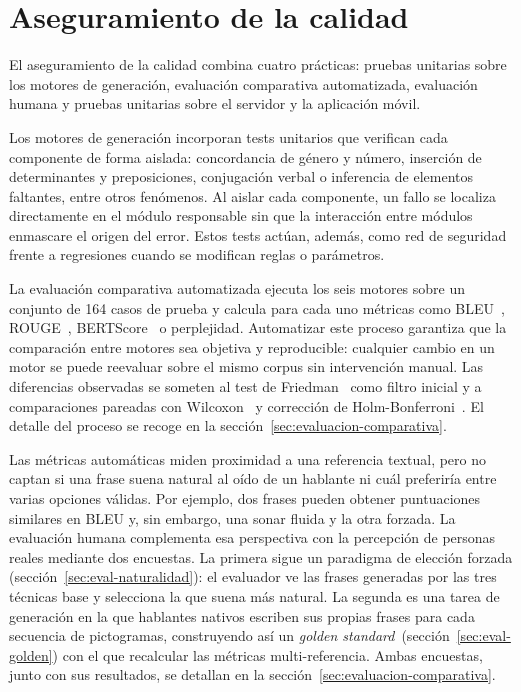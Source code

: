\section{Aseguramiento de la calidad}
\label{sec:calidad}

El aseguramiento de la calidad combina cuatro prácticas: pruebas unitarias sobre los motores de generación, evaluación comparativa automatizada, evaluación humana y pruebas unitarias sobre el servidor y la aplicación móvil.

Los motores de generación incorporan tests unitarios que verifican cada componente de forma aislada: concordancia de género y número, inserción de determinantes y preposiciones, conjugación verbal o inferencia de elementos faltantes, entre otros fenómenos. Al aislar cada componente, un fallo se localiza directamente en el módulo responsable sin que la interacción entre módulos enmascare el origen del error. Estos tests actúan, además, como red de seguridad frente a regresiones cuando se modifican reglas o parámetros.

La evaluación comparativa automatizada ejecuta los seis motores sobre un conjunto de 164 casos de prueba y calcula para cada uno métricas como BLEU~\cite{papineni2002bleu}, ROUGE~\cite{lin2004rouge}, BERTScore~\cite{zhang2020bertscore} o perplejidad. Automatizar este proceso garantiza que la comparación entre motores sea objetiva y reproducible: cualquier cambio en un motor se puede reevaluar sobre el mismo corpus sin intervención manual. Las diferencias observadas se someten al test de Friedman~\cite{friedman1937use} como filtro inicial y a comparaciones pareadas con Wilcoxon~\cite{wilcoxon1945individual} y corrección de Holm-Bonferroni~\cite{holm1979simple}. El detalle del proceso se recoge en la sección~\ref{sec:evaluacion-comparativa}.

Las métricas automáticas miden proximidad a una referencia textual, pero no captan si una frase suena natural al oído de un hablante ni cuál preferiría entre varias opciones válidas. Por ejemplo, dos frases pueden obtener puntuaciones similares en BLEU y, sin embargo, una sonar fluida y la otra forzada. La evaluación humana complementa esa perspectiva con la percepción de personas reales mediante dos encuestas. La primera sigue un paradigma de elección forzada (sección~\ref{sec:eval-naturalidad}): el evaluador ve las frases generadas por las tres técnicas base y selecciona la que suena más natural. La segunda es una tarea de generación en la que hablantes nativos escriben sus propias frases para cada secuencia de pictogramas, construyendo así un \textit{golden standard}~(sección~\ref{sec:eval-golden}) con el que recalcular las métricas multi-referencia. Ambas encuestas, junto con sus resultados, se detallan en la sección~\ref{sec:evaluacion-comparativa}.

